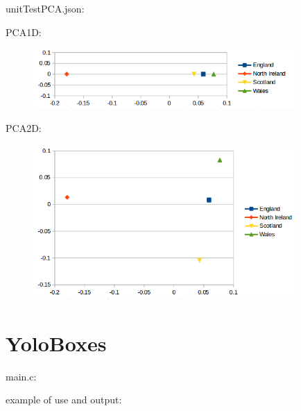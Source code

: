 unitTestPCA.json:\\
\begin{scriptsize}
\begin{ttfamily}

\end{ttfamily}
\end{scriptsize}

PCA1D:\\
\begin{center}
\begin{figure}[H]
\centering\includegraphics[width=10cm]{../PCA1D.png}\\
\end{figure}
\end{center}

PCA2D:\\
\begin{center}
\begin{figure}[H]
\centering\includegraphics[width=10cm]{../PCA2D.png}\\
\end{figure}
\end{center}

\section{YoloBoxes}

main.c:\\
\begin{scriptsize}
\begin{ttfamily}

\end{ttfamily}
\end{scriptsize}

example of use and output:\\
\begin{scriptsize}
\begin{ttfamily}

\end{ttfamily}
\end{scriptsize}
